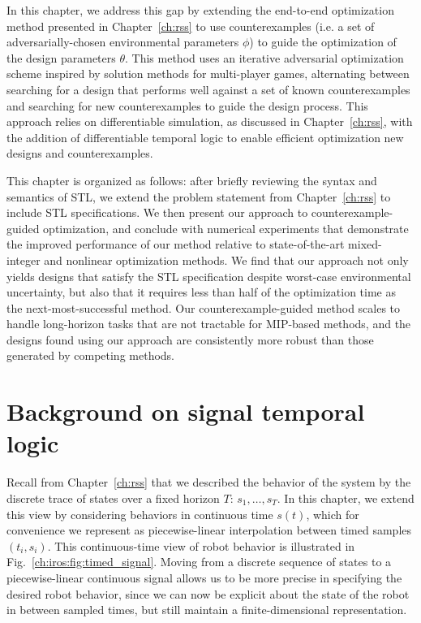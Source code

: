In this chapter, we address this gap by extending the end-to-end optimization method presented in Chapter~\ref{ch:rss} to use counterexamples (i.e. a set of adversarially-chosen environmental parameters $\phi$) to guide the optimization of the design parameters $\theta$. This method uses an iterative adversarial optimization scheme inspired by solution methods for multi-player games, alternating between searching for a design that performs well against a set of known counterexamples and searching for new counterexamples to guide the design process. This approach relies on differentiable simulation, as discussed in Chapter~\ref{ch:rss}, with the addition of differentiable temporal logic to enable efficient optimization new designs and counterexamples.

This chapter is organized as follows: after briefly reviewing the syntax and semantics of STL, we extend the problem statement from Chapter~\ref{ch:rss} to include STL specifications. We then present our approach to counterexample-guided optimization, and conclude with numerical experiments that demonstrate the improved performance of our method relative to state-of-the-art mixed-integer and nonlinear optimization methods. We find that our approach not only yields designs that satisfy the STL specification despite worst-case environmental uncertainty, but also that it requires less than half of the optimization time as the next-most-successful method. Our counterexample-guided method scales to handle long-horizon tasks that are not tractable for MIP-based methods, and the designs found using our approach are consistently more robust than those generated by competing methods.

\section{Background on signal temporal logic}

Recall from Chapter~\ref{ch:rss} that we described the behavior of the system by the discrete trace of states over a fixed horizon $T$: $s_1, \ldots, s_T$. In this chapter, we extend this view by considering behaviors in continuous time $s(t)$, which for convenience we represent as piecewise-linear interpolation between timed samples $(t_i, s_i)$. This continuous-time view of robot behavior is illustrated in Fig.~\ref{ch:iros:fig:timed_signal}. Moving from a discrete sequence of states to a piecewise-linear continuous signal allows us to be more precise in specifying the desired robot behavior, since we can now be explicit about the state of the robot in between sampled times, but still maintain a finite-dimensional representation.

